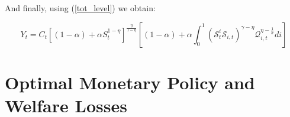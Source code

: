 \documentclass{article}
\begin{document}
And finally, using (\ref{tot_level}) we obtain:

\begin{equation}
    Y_{t} = C_t \left[(1-\alpha) + \alpha S_t^{1-\eta} \right]^{\frac{\eta}{1-\eta}} \left[(1-\alpha)  +  \alpha \int_0^1 \left(\mathcal S^i_t \mathcal S_{i,t} \right)^{\gamma - \eta} \mathcal Q^{\eta - \frac{1}{\sigma}}_{i,t} di \right] 
\end{equation}

\section{Optimal Monetary Policy and Welfare Losses}
\end{document}
